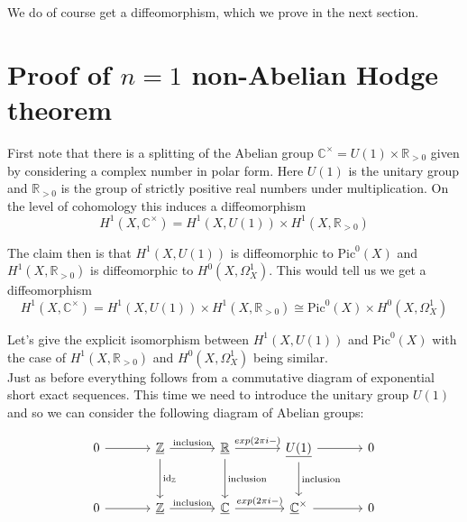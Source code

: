 We do of course get a diffeomorphism, which we prove in the next section.

\section{Proof of $n=1 $ non-Abelian Hodge theorem}

First note that there is a splitting of the Abelian group $\mathbb{C}^\times=U(1)\times\mathbb{R}_{>0}$ given by considering a complex number in polar form. Here $U(1)$ is the unitary group and $\mathbb{R}_{>0}$ is the group of strictly positive real numbers under multiplication. On the level of cohomology this induces a diffeomorphism
\begin{equation*}
H^{1}(X,\mathbb{C}^\times)=H^{1}(X,U(1))\times H^{1}(X,\mathbb{R}_{>0})
\end{equation*}

The claim then is that $H^{1}(X,U(1))$ is diffeomorphic to $\textrm{Pic}^{0}(X)$ and $H^{1}(X,\mathbb{R}_{>0})$ is diffeomorphic to $H^{0}(X,\Omega_{X}^{1})$. This would tell us we get a diffeomorphism
\begin{equation*}
H^{1}(X,\mathbb{C}^\times)=H^{1}(X,U(1))\times H^{1}(X,\mathbb{R}_{>0})\cong \textrm{Pic}^{0}(X)\times H^{0}(X,\Omega_{X}^{1})
\end{equation*}

Let's give the explicit isomorphism between $H^{1}(X,U(1))$ and $\textrm{Pic}^{0}(X)$ with the case of $H^{1}(X,\mathbb{R}_{>0})$ and $H^{0}(X,\Omega_{X}^{1})$ being similar.\\

Just as before everything follows from a commutative diagram of exponential short exact sequences. This time we need to introduce the unitary group $U(1)$ and so we can consider the following diagram of Abelian groups:


\begin{equation}\label{SESDiagram2}
\begin{tikzcd}[sep=large]
0 \arrow[r] & \underline{\mathbb{Z}} \arrow[r, "\textrm{inclusion}"] \arrow[d, "\textrm{id}_{\mathbb{Z}}"] & \underline{\mathbb{R}} \arrow[r, "exp(2\pi i - )"] \arrow[d, "\textrm{inclusion}"]  & \underline{U(1)} \arrow[r] \arrow[d, "\textrm{inclusion}"] & 0\\
0 \arrow[r] & \underline{\mathbb{Z}} \arrow[r, "\textrm{inclusion}"] & \underline{\mathbb{C}} \arrow[r, "exp(2\pi i - )"]  & \underline{\mathbb{C}}^\times \arrow[r] & 0\\
\end{tikzcd}
\end{equation}

